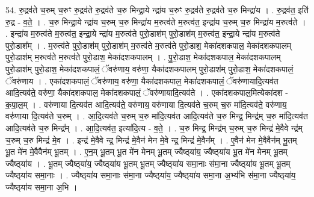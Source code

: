 \documentclass[17pt]{extarticle}
\begin{document}
54. रु॒द्रव॑ते च॒रुम् च॒रुꣳ रु॒द्रव॑ते रु॒द्रव॑ते च॒रु मिन्द्रा॒ये न्द्रा॑य च॒रुꣳ रु॒द्रव॑ते रु॒द्रव॑ते च॒रु मिन्द्रा॑य । . रु॒द्रव॑त॒ इति॑ रु॒द्र - व॒ते॒ । . च॒रु मिन्द्रा॒ये न्द्रा॑य च॒रुम् च॒रु मिन्द्रा॑य म॒रुत्व॑ते म॒रुत्व॑त॒ इन्द्रा॑य च॒रुम् च॒रु मिन्द्रा॑य म॒रुत्व॑ते । . इन्द्रा॑य म॒रुत्व॑ते म॒रुत्व॑त॒ इन्द्रा॒ये न्द्रा॑य म॒रुत्व॑ते पुरो॒डाश॑म् पुरो॒डाश॑म् म॒रुत्व॑त॒ इन्द्रा॒ये न्द्रा॑य म॒रुत्व॑ते पुरो॒डाश᳚म् । . म॒रुत्व॑ते पुरो॒डाश॑म् पुरो॒डाश॑म् म॒रुत्व॑ते म॒रुत्व॑ते पुरो॒डाश॒ मेका॑दशकपाल॒ मेका॑दशकपालम् पुरो॒डाश॑म् म॒रुत्व॑ते म॒रुत्व॑ते पुरो॒डाश॒ मेका॑दशकपालम् । . पु॒रो॒डाश॒ मेका॑दशकपाल॒ मेका॑दशकपालम् पुरो॒डाश॑म् पुरो॒डाश॒ मेका॑दशकपालं॒ ॅवरु॑णाय॒ वरु॑णा॒ यैका॑दशकपालम् पुरो॒डाश॑म् पुरो॒डाश॒ मेका॑दशकपालं॒ ॅवरु॑णाय । . एका॑दशकपालं॒ ॅवरु॑णाय॒ वरु॑णा॒ यैका॑दशकपाल॒ मेका॑दशकपालं॒ ॅवरु॑णायादि॒त्यव॑त आदि॒त्यव॑ते॒ वरु॑णा॒ यैका॑दशकपाल॒ मेका॑दशकपालं॒ ॅवरु॑णायादि॒त्यव॑ते । . एका॑दशकपाल॒मित्येका॑दश - क॒पा॒ल॒म् । . वरु॑णाया दि॒त्यव॑त आदि॒त्यव॑ते॒ वरु॑णाय॒ वरु॑णाया दि॒त्यव॑ते च॒रुम् च॒रु मा॑दि॒त्यव॑ते॒ वरु॑णाय॒ वरु॑णाया दि॒त्यव॑ते च॒रुम् । . आ॒दि॒त्यव॑ते च॒रुम् च॒रु मा॑दि॒त्यव॑त आदि॒त्यव॑ते च॒रु मिन्द्र॒ मिन्द्र॑म् च॒रु मा॑दि॒त्यव॑त आदि॒त्यव॑ते च॒रु मिन्द्र᳚म् । . आ॒दि॒त्यव॑त॒ इत्या॑दि॒त्य - व॒ते॒ । . च॒रु मिन्द्र॒ मिन्द्र॑म् च॒रुम् च॒रु मिन्द्र॑ मे॒वैवे न्द्र॑म् च॒रुम् च॒रु मिन्द्र॑ मे॒व । . इन्द्र॑ मे॒वैवे न्द्र॒ मिन्द्र॑ मे॒वैन॑ मेन मे॒वे न्द्र॒ मिन्द्र॑ मे॒वैन᳚म् । . ए॒वैन॑ मेन मे॒वैवैन॑म् भू॒तम् भू॒त मे॑न मे॒वैवैन॑म् भू॒तम् । . ए॒न॒म् भू॒तम् भू॒त मे॑न मेनम् भू॒तम् ज्यैष्ठ्‍या॑य॒ ज्यैष्ठ्‍या॑य भू॒त मे॑न मेनम् भू॒तम् ज्यैष्ठ्‍या॑य । . भू॒तम् ज्यैष्ठ्‍या॑य॒ ज्यैष्ठ्‍या॑य भू॒तम् भू॒तम् ज्यैष्ठ्‍या॑य समा॒नाः स॑मा॒ना ज्यैष्ठ्‍या॑य भू॒तम् भू॒तम् ज्यैष्ठ्‍या॑य समा॒नाः । . ज्यैष्ठ्‍या॑य समा॒नाः स॑मा॒ना ज्यैष्ठ्‍या॑य॒ ज्यैष्ठ्‍या॑य समा॒ना अ॒भ्य॑भि स॑मा॒ना ज्यैष्ठ्‍या॑य॒ ज्यैष्ठ्‍या॑य समा॒ना अ॒भि । \newline
\end{document}
